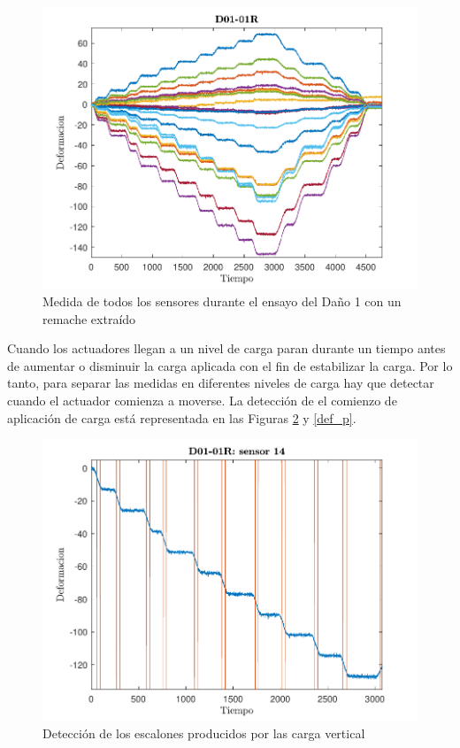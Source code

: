 \begin{figure}[h!]
    \centering
    \includegraphics[width=125mm, angle=0]{3/Fotos/Sensores_FBG.pdf}
    \captionsetup{justification=centering,margin=1.25cm}
    \caption{Medida de todos los sensores durante el ensayo del Daño 1 con un remache extraído}
    \label{def_t}
\end{figure}
    
Cuando los actuadores llegan a un nivel de carga paran durante un tiempo antes de aumentar o disminuir la carga aplicada con el fin de estabilizar la carga. Por lo tanto, para separar las medidas en diferentes niveles de carga hay que detectar cuando el actuador comienza a moverse. La detección de el comienzo de aplicación de carga está representada en las Figuras \ref{def_s} y \ref{def_p}.
    
\begin{figure}[h!]
    \centering
    \includegraphics[width=125mm, angle=0]{3/Fotos/Saltos_FBG.pdf}
    \captionsetup{justification=centering,margin=1.25cm}
    \caption{Detección de los escalones producidos por las carga vertical}
    \label{def_s}
\end{figure}
    
